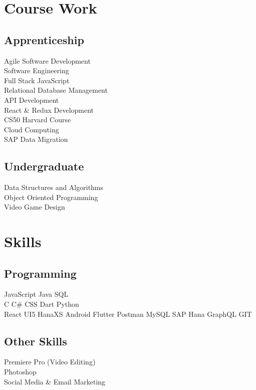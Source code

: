 \documentclass[]{deedy-resume-openfont}
\begin{document}
\begin{minipage}[t]{0.33\textwidth}
\section{Course Work}

\subsection{Apprenticeship}
Agile Software Development  \\
Software Engineering \\
Full Stack JavaScript \\
Relational Database Management \\
API Development \\
React & Redux Development \\
CS50 Harvard Course \\
Cloud Computing \\
SAP Data Migration \\
\vspace{\topsep} %
\subsection{Undergraduate}
Data Structures and Algorithms \\
Object Oriented Programming  \\
Video Game Design \\



\section{Skills}
\subsection{Programming}
JavaScript \textbullet{}   Java \textbullet{} SQL\\
C \textbullet{} C\# \textbullet{} CSS \textbullet{} Dart \textbullet{} Python \\
React \textbullet{} UI5 \textbullet{} HanaXS \textbullet{} Android \textbullet{} Flutter \textbullet{} Postman \textbullet{} MySQL \textbullet{} SAP Hana \textbullet{} GraphQL \textbullet{} GIT
\sectionsep

\subsection{Other Skills}
\textbullet{} Premiere Pro (Video Editing) \\
\textbullet{} Photoshop \\
\textbullet{} Social Media & Email Marketing \\

%
%

\end{minipage} 
\end{document}
